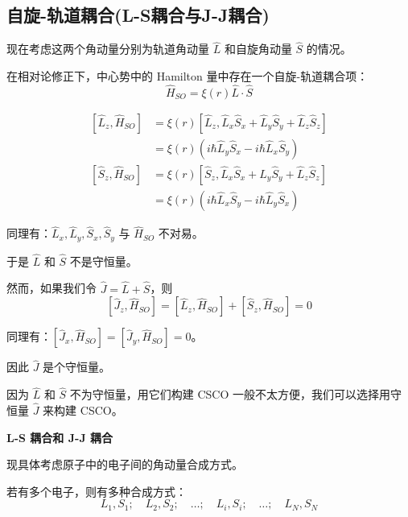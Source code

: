 \documentclass[lang=cn,10pt]{elegantbook}
\begin{document}
\subsection{自旋-轨道耦合(L-S耦合与J-J耦合)}

现在考虑这两个角动量分别为轨道角动量 $\hat{L}$ 和自旋角动量 $\hat{S}$ 的情况。

在相对论修正下，中心势中的 Hamilton 量中存在一个自旋-轨道耦合项：
\[
\hat{H}_{SO} = \xi(r) \hat{L} \cdot \hat{S}
\]

\[
\begin{align*}
	[\hat{L}_z, \hat{H}_{SO}] &= \xi(r) [\hat{L}_z, \hat{L}_x \hat{S}_x + \hat{L}_y \hat{S}_y + \hat{L}_z \hat{S}_z] \\
	&= \xi(r) (i \hbar \hat{L}_y \hat{S}_x - i \hbar \hat{L}_x \hat{S}_y) \\
	[\hat{S}_z, \hat{H}_{SO}] &= \xi(r) [\hat{S}_z, \hat{L}_x \hat{S}_x + \hat{L}_y \hat{S}_y + \hat{L}_z \hat{S}_z] \\
	&= \xi(r) (i \hbar \hat{L}_x \hat{S}_y - i \hbar \hat{L}_y \hat{S}_x)
\end{align*}
\]

同理有：$\hat{L}_x, \hat{L}_y, \hat{S}_x, \hat{S}_y$ 与 $\hat{H}_{SO}$ 不对易。

于是 $\hat{L}$ 和 $\hat{S}$ 不是守恒量。

然而，如果我们令 $\hat{J} = \hat{L} + \hat{S}$，则
\[
[\hat{J}_z, \hat{H}_{SO}] = [\hat{L}_z, \hat{H}_{SO}] + [\hat{S}_z, \hat{H}_{SO}] = 0
\]

同理有：$[\hat{J}_x, \hat{H}_{SO}] = [\hat{J}_y, \hat{H}_{SO}] = 0$。

因此 $\hat{J}$ 是个守恒量。

因为 $\hat{L}$ 和 $\hat{S}$ 不为守恒量，用它们构建 CSCO 一般不太方便，我们可以选择用守恒量 $\hat{J}$ 来构建 CSCO。

\textbf{L-S 耦合和 J-J 耦合}

现具体考虑原子中的电子间的角动量合成方式。

若有多个电子，则有多种合成方式：
\[
L_1, S_1; \quad L_2, S_2; \quad \ldots; \quad L_i, S_i; \quad \ldots; \quad L_N, S_N
\]
\end{document}
